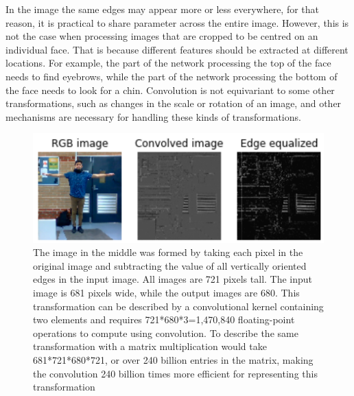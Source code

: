 In the image the same edges may appear more or less everywhere, for that reason, it is practical to share parameter across the entire image. However, this is not the case when processing images that are cropped to be centred on an individual face. That is because different features should be extracted at different locations. For example, the part of the network processing the top of the face needs to find eyebrows, while the part of the network processing the bottom of the face needs to look for a chin. Convolution is not equivariant to some other transformations, such as changes in the scale or rotation of an image, and other mechanisms are necessary for handling these kinds of transformations.\\

\begin{figure}[th]
\centering
\includegraphics{Figures/edgedetection.png}
\decoRule
\caption[The image in the middle was formed by taking each pixel in the original image and subtracting the value of all vertically oriented edges in the input image. All images are 721 pixels tall. The input image is 681 pixels wide, while the output images are 680. This transformation can be described by a convolutional kernel containing two elements and requires 721*680*3=1,470,840 floating-point operations to compute using convolution. To describe the same transformation with a matrix multiplication would take 681*721*680*721, or over 240 billion entries in the matrix, making the convolution 240 billion times more efficient for representing this transformation]{The image in the middle was formed by taking each pixel in the original image and subtracting the value of all vertically oriented edges in the input image. All images are 721 pixels tall. The input image is 681 pixels wide, while the output images are 680. This transformation can be described by a convolutional kernel containing two elements and requires 721*680*3=1,470,840 floating-point operations to compute using convolution. To describe the same transformation with a matrix multiplication would take 681*721*680*721, or over 240 billion entries in the matrix, making the convolution 240 billion times more efficient for representing this transformation}
\label{fig:lala}
\end{figure}\\

